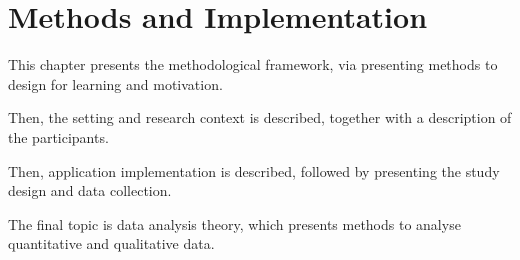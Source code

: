 \chapter{Methods and Implementation}\label{cha:Method}





This chapter presents the methodological framework, via presenting methods to design for learning and motivation.

Then, the setting and research context is described, together with a description of the participants.

Then, application implementation is described, followed by presenting the study design and data collection.

The final topic is data analysis theory, which presents methods to analyse quantitative and qualitative data.













